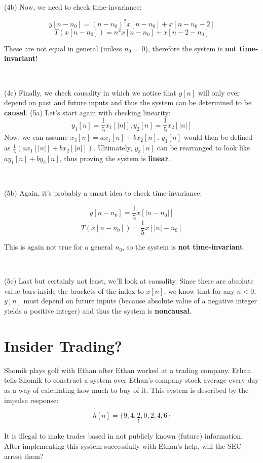 \documentclass{article}
\begin{document}
\

\noindent (4b) Now, we need to check time-invariance:

$$y[n-n_0] = (n-n_0)^2x[n-n_0] + x[n-n_0-2]$$
$$T(x[n-n_0]) = n^2x[n-n_0] + x[n-2-n_0]$$

\noindent These are not equal in general (unless $n_0$ = 0), therefore the system is \textbf{not time-invariant}!

\

\noindent (4c) Finally, we check causality in which we notice that $y[n]$ will only ever depend on past and future inputs and thus the system can be determined to be \textbf{causal}.
\newpage
\noindent (5a) Let's start again with checking linearity:
$$y_1[n]=\frac{1}{5}x_1[|n|], y_2[n]=\frac{1}{5}x_2[|n|]$$
\noindent Now, we can assume $x_3[n]=ax_1[n]+bx_2[n]$. $y_3[n]$ would then be defined as $\frac{1}{5}(ax_1[|n|]+bx_2[|n|])$. Ultimately, $y_3[n]$ can be rearranged to look like $ay_1[n]+by_2[n]$, thus proving the system is \textbf{linear}.

\

\noindent (5b) Again, it's probably a smart idea to check time-invariance:

$$y[n-n_0] = \frac{1}{5}x[|n-n_0|]$$
$$T(x[n-n_0]) = \frac{1}{5}x[|n| - n_0]$$

\noindent This is again not true for a general $n_0$, so the system is \textbf{not time-invariant}. 

\

\noindent (5c) Last but certainly not least, we'll look at causality. Since there are absolute value bars inside the brackets of the index to $x[n]$, we know that for any $n<0$, $y[n]$ must depend on future inputs (because absolute value of a negative integer yields a positive integer) and thus the system is \textbf{noncausal}.

\newpage

\section{Insider Trading?}

Shomik plays golf with Ethan after Ethan worked at a trading company. Ethan tells Shomik to construct a system over Ethan's company stock average every day as a way of calculating how much to buy of it. This system is described by the impulse response:

$$h[n] = \{9,4,\underset{\uparrow}{2},0,2,4,6\}$$

\noindent It is illegal to make trades based in not publicly known (future) information. After implementing this system successfully with Ethan's help, will the SEC arrest them?
\end{document}
